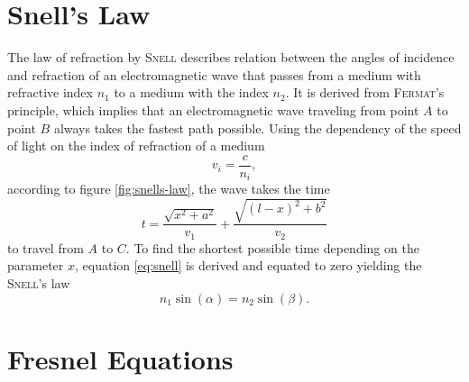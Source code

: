 \documentclass[../thesis.tex]{subfiles}
\begin{document}
    \section{Snell's Law}
    \label{sec:snells-law}

    The law of refraction by \textsc{Snell} describes relation between the angles of incidence and refraction of an electromagnetic wave that passes from a medium with refractive index $n_1$ to a medium with the index $n_2$. It is derived from \textsc{Fermat}'s principle, which implies that an electromagnetic wave traveling from point $A$ to point $B$ always takes the fastest path possible. Using the dependency of the speed of light on the index of refraction of a medium
    \begin{equation}
        v_i = \frac{c}{n_i},
    \end{equation}
    according to figure \cref{fig:snells-law}, the wave takes the time
    \begin{equation}
        t=\frac{\sqrt{x^2 + a^2}}{v_1} + \frac{\sqrt{(l-x)^2 + b^2}}{v_2}
        \label{eq:snell}
    \end{equation}
    to travel from $A$ to $C$. To find the shortest possible time depending on the parameter $x$, equation \cref{eq:snell} is derived and equated to zero yielding the \textsc{Snell}'s law
    \begin{equation}
        n_1 \sin\left(\alpha\right) = n_2 \sin\left(\beta\right).
        \label{eq:snells-law}
    \end{equation}

    


    \section{Fresnel Equations}
    \label{sec:fresnel-equations}
\end{document}
